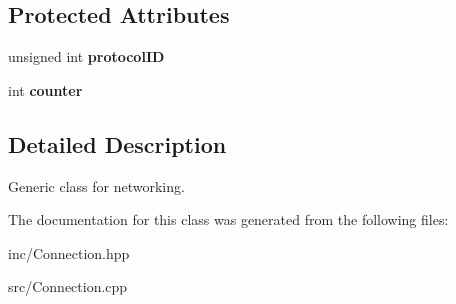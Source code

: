 \subsection*{Protected Attributes}
\begin{DoxyCompactItemize}
\item 
\hypertarget{class_connection_a4ecbc2b0eaeea77b40f2cc1a33441290}{unsigned int {\bfseries protocol\+I\+D}}\label{class_connection_a4ecbc2b0eaeea77b40f2cc1a33441290}

\item 
\hypertarget{class_connection_a0e79466844a23afb68662fb3fa7c8f74}{int {\bfseries counter}}\label{class_connection_a0e79466844a23afb68662fb3fa7c8f74}

\end{DoxyCompactItemize}


\subsection{Detailed Description}
Generic class for networking. 

The documentation for this class was generated from the following files\+:\begin{DoxyCompactItemize}
\item 
inc/Connection.\+hpp\item 
src/Connection.\+cpp\end{DoxyCompactItemize}
